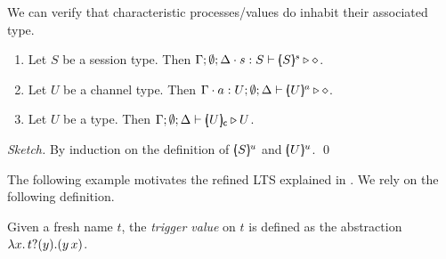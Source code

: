 

\noi We can verify that characteristic processes/values  
do inhabit their associated type.

\begin{proposition}
	\begin{enumerate}
		\item	
				Let $S$ be a session type.
				Then $\Gamma; \emptyset; \Delta \cdot s: S \vdash [\!\!(S)\!\!]^{s} \triangleright \diamond$.
		\item	
				Let $U$ be a channel type.
				Then $\Gamma \cdot a: U; \emptyset; \Delta \vdash [\!\!(U)\!\!]^{a} \triangleright \diamond$.

		\item	Let $U$ be a type.
				Then $\Gamma; \emptyset; \Delta \vdash [\!\!(U)\!\!]_{\mathsf{c}} \triangleright U$.
	\end{enumerate}
\end{proposition}

\begin{proof}[Sketch]
	By induction on the definition of $[\!\!(S)\!\!]^{u}$
	and $[\!\!(U)\!\!]^{u}$. 
	\qed
\end{proof}

The following example motivates the refined 
LTS explained in .
We rely on the following definition.

\begin{definition}\label{d:trigger}
Given a fresh name $t$, the \emph{trigger value} on $t$ is defined as the abstraction
$\lambda {x}.\,t ? (y) . (y\, {{x}})$.
\end{definition}





